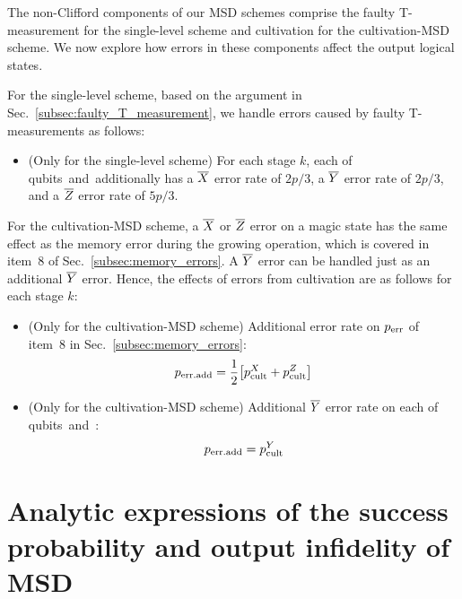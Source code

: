 \documentclass[
 prx,
 reprint,
 superscriptaddress,
 longbibliography,
 dvipsnames
]{revtex4-2}
\begin{document}
\begin{widetext}
The non-Clifford components of our MSD schemes comprise the faulty T-measurement for the single-level scheme and cultivation for the cultivation-MSD scheme.
We now explore how errors in these components affect the output logical states.

For the single-level scheme, based on the argument in Sec.~\ref{subsec:faulty_T_measurement}, we handle errors caused by faulty T-measurements as follows:
\begin{itemize}
    \item (Only for the single-level scheme) For each stage $k$, each of qubits~\talpha and~\tbeta additionally has a $\overline{X}$ error rate of $2p/3$, a $\overline{Y}$ error rate of $2p/3$, and a $\overline{Z}$ error rate of $5p/3$.
\end{itemize}

For the cultivation-MSD scheme, a $\overline{X}$ or $\overline{Z}$ error on a magic state has the same effect as the memory error during the growing operation, which is covered in item~8 of Sec.~\ref{subsec:memory_errors}.
A $\overline{Y}$ error can be handled just as an additional $\overline{Y}$ error.
Hence, the effects of errors from cultivation are as follows for each stage $k$:
\begin{itemize}
    \item (Only for the cultivation-MSD scheme) Additional error rate on $p_{\mathrm{err}}$ of item~8 in Sec.~\ref{subsec:memory_errors}:
    \begin{align*}
        p_{\mathrm{err.add}} = \frac{1}{2}\qty[p_{\mathrm{cult}}^{X} + p_{\mathrm{cult}}^{Z}]
    \end{align*}
    \item (Only for the cultivation-MSD scheme) Additional $\overline{Y}$ error rate on each of qubits~\talpha and~\tbeta:
    \begin{align*}
        p_{\mathrm{err.add}} = p_{\mathrm{cult}}^{Y}
    \end{align*}
\end{itemize}

\section{Analytic expressions of the success probability and output infidelity of MSD \label{app:MSD_performance_expressions}}


\end{widetext}
\end{document}
